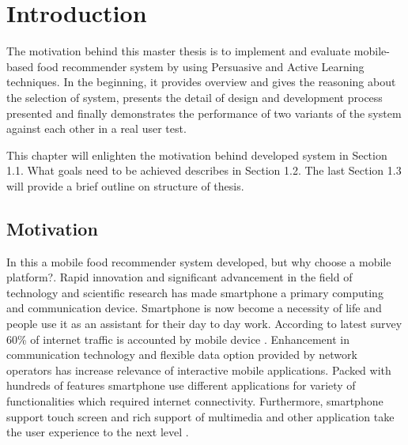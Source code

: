 \chapter{Introduction}
\setcounter{page}{1}%
\thispagestyle{empty}

The motivation behind this master thesis is to implement and evaluate mobile-based food recommender system by using Persuasive and Active Learning techniques. In the beginning, it provides overview and gives the reasoning about the selection of system, presents the detail of design and development process presented and finally demonstrates the performance of two variants of the system against each other in a real user test. \newline

This chapter will enlighten the motivation behind developed system in Section 1.1.  What goals need to be achieved describes in Section 1.2. The last Section 1.3 will provide a brief outline on structure of thesis.

\section{Motivation}\label{motivation}

In this a mobile food recommender system developed, but why choose a mobile platform?. Rapid innovation and significant advancement in the field of technology and scientific research has made smartphone a primary computing and communication device. Smartphone is now become a necessity of life and people use it as an assistant for their day to day work. According to latest survey 60\% of internet traffic is accounted by mobile device \cite{shawnhessinger2014mobiletraffic}. Enhancement in communication technology and flexible data option provided by network operators has increase relevance of interactive mobile applications. Packed with hundreds of features smartphone use different applications for variety of functionalities which required internet connectivity. Furthermore, smartphone support touch screen and rich support of multimedia and other application take the user experience to the next level \cite{ricci2010mobile}.\newline

